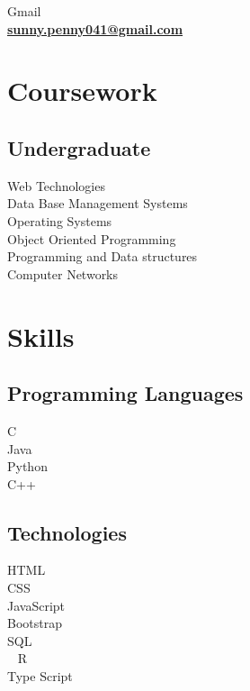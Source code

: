 \documentclass[]{deedy-resume-openfont}
\begin{document}
\begin{minipage}[t]{0.33\textwidth}
 \textbullet{} Gmail  \href{mailto:sunny.penny041@gmail.com}{\\ \textbf{sunny.penny041@gmail.com}}


\section{Coursework}

\subsection{Undergraduate}
 \textbullet{} Web Technologies \\
 \textbullet{} Data Base Management Systems \\
 \textbullet{} Operating Systems \\
 \textbullet{} Object Oriented Programming \\
 \textbullet{} Programming and Data structures \\
  \textbullet{} Computer Networks
 


\section{Skills}
\subsection{Programming Languages}
 \textbullet{}C \\ \textbullet{} Java \\ \textbullet{}Python \\ \textbullet{}C++
\vspace{0.10cm}  
\subsection{Technologies}
\textbullet{} HTML  \\ \textbullet{} CSS \\
 \textbullet{} JavaScript  \\ \textbullet{} Bootstrap  \\
 \textbullet{} SQL
\\\ \textbullet{} R  \\ \textbullet{} Type Script \\
\sectionsep


\end{minipage}
\end{document}
